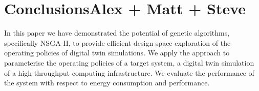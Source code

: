 \documentclass[10pt, conference, compsocconf]{IEEEtran}
\begin{document}
%



\section{Conclusions{\color{red}Alex + Matt + Steve}}
\label{conc}
In this paper we have demonstrated the potential of genetic algorithms, specifically NSGA-II, to provide efficient design space exploration of the operating policies of digital twin simulations. We apply the approach to parameterise the operating policies of a target system, a digital twin simulation of a high-throughput computing infrastructure. We evaluate the performance of the system with respect to energy consumption and performance.





\end{document}
